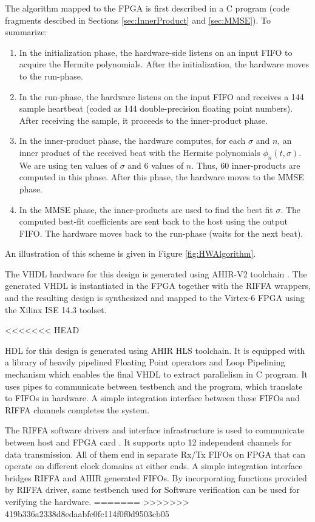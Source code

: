 \documentclass[runningheads]{llncs}
\begin{document}
The algorithm mapped to the FPGA 
is first described in a C program (code fragments descibed in Sections \ref{sec:InnerProduct} and \ref{sec:MMSE}).
To summarize:
\begin{enumerate}
\item In the initialization phase, the hardware-side listens on an input FIFO to acquire
the Hermite polynomials.  After the initialization, the hardware moves to the run-phase.
\item In the run-phase, the hardware listens on the input FIFO and receives a 144 sample
heartbeat (coded as 144 double-precision floating point numbers).  After receiving
the sample, it proceeds to the inner-product phase.
\item In the inner-product phase, the hardware computes, for each $\sigma$ and
$n$, an inner product of the received beat with the Hermite polynomials $\phi_n(t,\sigma)$.
We are using ten values of $\sigma$ and $6$ values of $n$.  Thus, 60 inner-products
are computed in this phase.  After this phase, the hardware moves to the MMSE
phase.
\item  In the MMSE phase, the inner-products are used to find the best fit $\sigma$.
The computed best-fit coefficients are sent back to the host using the output FIFO.
The hardware moves back to the run-phase (waits for the next beat).
\end{enumerate}
An illustration of this scheme is given in Figure \ref{fig:HWAlgorithm}.

The VHDL hardware for this design is generated using AHIR-V2 toolchain \cite{c:ahir_usenix2012}.  
The generated VHDL is instantiated in the FPGA together with the RIFFA wrappers,
and the resulting design is synthesized and mapped to the Virtex-6 FPGA using
the Xilinx ISE 14.3 toolset.


<<<<<<< HEAD

HDL for this design is generated using AHIR HLS toolchain. It is equipped with a library 
of heavily pipelined Floating Point operators and Loop Pipelining mechanism which 
enables the final VHDL to extract parallelism in C program. It uses pipes to communicate 
between testbench and the program, which translate to FIFOs in hardware. A simple integration 
interface between these FIFOs and RIFFA channels completes the system. 


The RIFFA software drivers and interface infrastructure is used to communicate between 
host and FPGA card \cite{c:jacobsen13}. It supports upto 12 independent
channels for data transmission. All of them end in separate Rx/Tx FIFOs on FPGA that 
can operate on different clock domains at either ends. A simple integration 
interface bridges RIFFA and AHIR generated FIFOs.
By incorporating functions provided by RIFFA driver, same testbench used for 
Software verification can be used for verifying the hardware.
=======
>>>>>>> 419b336a2338d8edaabfc0fc114f0f0d9503cb05
%
\end{document}
